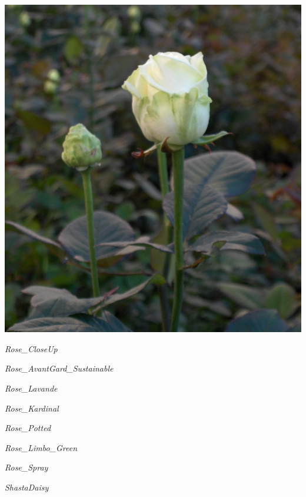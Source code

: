 \documentclass{article}
\begin{document}
\begin{center}
\includegraphics[height=0.9\textheight, angle=90]{../Rose_Akito.jpg}
\end{center}
\newpage

\noindent
\vfill
\centerline{{\Large\emph{Rose_CloseUp}}}
\vfill
\newpage

\noindent
\vfill
\centerline{{\Large\emph{Rose_AvantGard_Sustainable}}}
\vfill
\newpage

\noindent
\vfill
\centerline{{\Large\emph{Rose_Lavande}}}
\vfill
\newpage

\noindent
\vfill
\centerline{{\Large\emph{Rose_Kardinal}}}
\vfill
\newpage

\noindent
\vfill
\centerline{{\Large\emph{Rose_Potted}}}
\vfill
\newpage

\noindent
\vfill
\centerline{{\Large\emph{Rose_Limbo_Green}}}
\vfill
\newpage

\noindent
\vfill
\centerline{{\Large\emph{Rose_Spray}}}
\vfill
\newpage

\noindent
\vfill
\centerline{{\Large\emph{ShastaDaisy}}}
\vfill
\newpage
\end{document}
